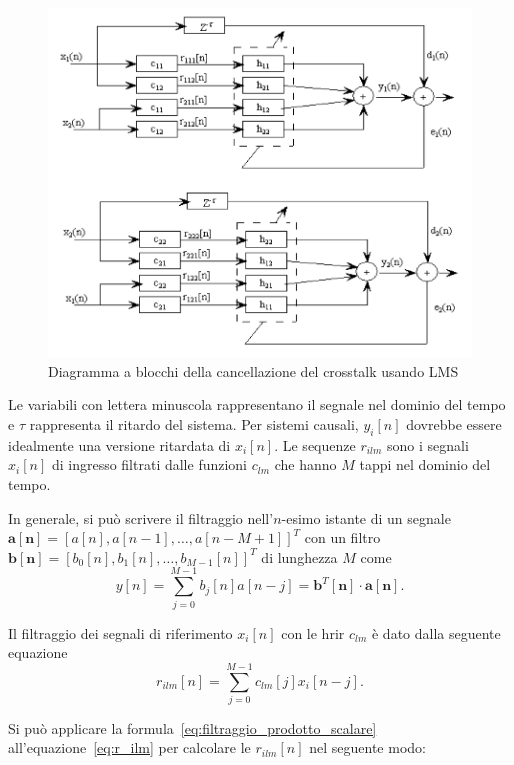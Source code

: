 \documentclass[12pt,a4paper,titlepage]{article}
\begin{document}
\begin{figure}[h]
	\centering	
	\includegraphics[width=\textwidth]{Immagini/lms.png}
	\caption{Diagramma a blocchi della cancellazione del crosstalk usando LMS}
	\label{fig:lms}
\end{figure}

Le variabili con lettera minuscola rappresentano il segnale nel dominio del tempo e $\tau$ rappresenta il ritardo del sistema. Per sistemi causali, $y_i[n]$ dovrebbe essere idealmente una versione ritardata di $x_i[n]$. Le sequenze $r_{ilm}$ sono i segnali $x_i[n]$ di ingresso filtrati dalle funzioni $c_{lm}$ che hanno $M$ tappi nel dominio del tempo.

In generale, si può scrivere il filtraggio nell'$n$-esimo istante di un segnale $\mathbf{a[n]} = \left[a[n], a[n-1], \dots, a[n - M + 1]\right]^T$ con un filtro $\mathbf{b[n]} =  \left[b_{0}[n], b_{1}[n], \dots, b_{M-1}[n]\right]^T$ di lunghezza $M$ come
\begin{equation}\label{eq:filtraggio_prodotto_scalare}
y[n] = \sum_{j=0}^{M-1}b_{j}[n]a[n-j] = \mathbf{b}^T[\mathbf{n}] \cdot \mathbf{a}[\mathbf{n}].
\end{equation}

Il filtraggio dei segnali di riferimento $x_i[n]$ con le hrir $c_{lm}$ è dato dalla seguente equazione
\begin{equation}\label{eq:r_ilm}
r_{ilm}[n]=\sum_{j=0}^{M-1}c_{lm}[j]x_i[n-j].
\end{equation}

Si può applicare la formula~\eqref{eq:filtraggio_prodotto_scalare} all'equazione~\eqref{eq:r_ilm} per calcolare le $r_{ilm}[n]$ nel seguente modo:
\end{document}
